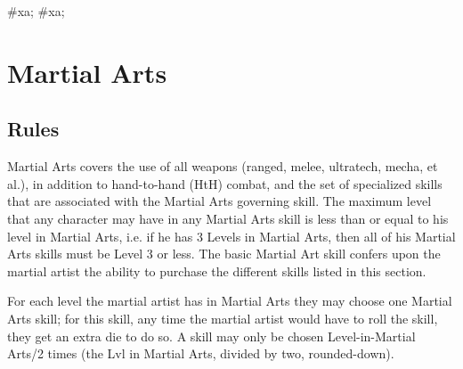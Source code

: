 \documentclass[twoside]{book}
\begin{document}
\begin{multicols}{2}
    \hspace{-2ex}
\#xa;
\#xa;
\vspace{1ex}
    
\end{multicols}
  
    

\chapter{Martial Arts}
    
    

\section{Rules}
    
    {  
      Martial Arts covers the use of all weapons (ranged,
             melee, ultratech, mecha, et al.), in addition to
             hand-to-hand (HtH) combat, and the set of specialized skills
             that are associated with the Martial Arts governing skill.
             The maximum level that any character may have in any Martial
             Arts skill is less than or equal to his level in Martial
             Arts, i.e. if he has 3 Levels in Martial Arts, then all of
             his Martial Arts skills must be Level 3 or less. The basic
             Martial Art skill confers upon the martial artist the
             ability to purchase the different skills listed in this
             section. 
    }
  
    {  
      For each level the martial artist has in Martial Arts
             they may choose one Martial Arts skill; for this skill, any
             time the martial artist would have to roll the skill, they
             get an extra die to do so. A skill may only be chosen
             Level-in-Martial Arts/2 times (the Lvl in Martial Arts,
             divided by two, rounded-down). 
    }
  
\end{document}
